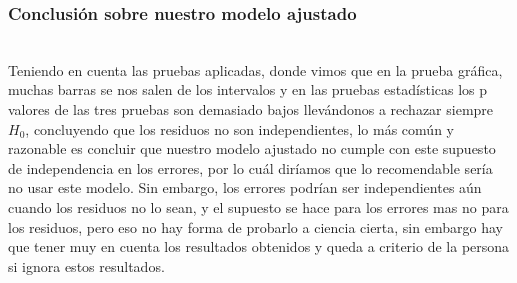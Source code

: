 \documentclass[12pt]{beamer}
\begin{document}
\begin{frame}
\frametitle{Conclusión sobre nuestro modelo ajustado}
~\\Teniendo en cuenta las pruebas aplicadas, donde vimos que en la prueba gráfica, muchas barras se nos salen de los intervalos y en las pruebas estadísticas los p valores de las tres pruebas son demasiado bajos llevándonos a rechazar siempre $H_{0}$, concluyendo que los residuos no son independientes, lo más común y razonable es concluir que nuestro modelo ajustado no cumple con este supuesto de independencia en los errores, por lo cuál diríamos que lo recomendable sería no usar este modelo. Sin embargo, los errores podrían ser independientes aún cuando los residuos no lo sean, y el supuesto se hace para los errores mas no para los residuos, pero eso no hay forma de probarlo a ciencia cierta, sin embargo hay que tener muy en cuenta los resultados obtenidos y queda a criterio de la persona si ignora estos resultados.
\end{frame}
\end{document}
